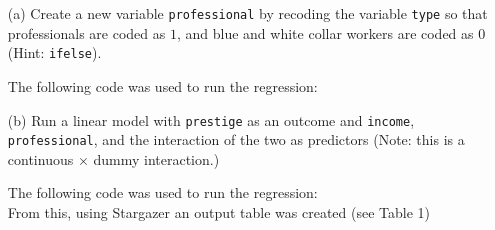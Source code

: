 \documentclass[12pt,letterpaper]{article}
\begin{document}
\newpage
\begin{enumerate}
	
	\item [(a)]
	Create a new variable \texttt{professional} by recoding the variable \texttt{type} so that professionals are coded as $1$, and blue and white collar workers are coded as $0$ (Hint: \texttt{ifelse}). \\
	
	\vspace{0.5cm}
	
	\noindent The following code was used to run the regression: \\
	
	
	
	\item [(b)]
	Run a linear model with \texttt{prestige} as an outcome and \texttt{income}, \texttt{professional}, and the interaction of the two as predictors (Note: this is a continuous $\times$ dummy interaction.)
	
	\vspace{0.5cm}
	
	\noindent The following code was used to run the regression: \\
	
	\noindent From this, using Stargazer an output table was created (see Table 1)
	

\end{enumerate}
\end{document}
